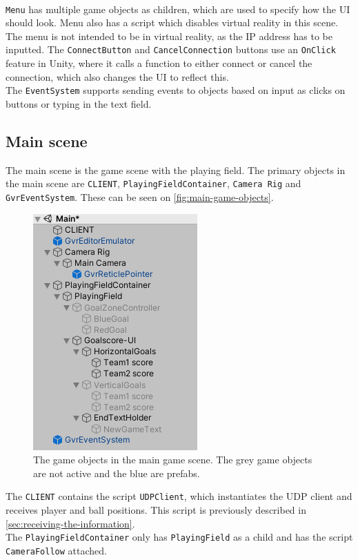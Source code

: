 \\
\texttt{Menu} has multiple game objects as children, which are used to specify how the UI should look.
Menu also has a script which disables virtual reality in this scene.
The menu is not intended to be in virtual reality, as the IP address has to be inputted.
The \texttt{ConnectButton} and \texttt{CancelConnection} buttons use an \texttt{OnClick} feature in Unity, where it calls a function to either connect or cancel the connection, which also changes the UI to reflect this.
\\
The \texttt{EventSystem} supports sending events to objects based on input as clicks on buttons or typing in the text field.

\subsection{Main scene}
The main scene is the game scene with the playing field.
The primary objects in the main scene are \texttt{CLIENT}, \texttt{PlayingFieldContainer}, \texttt{Camera Rig} and \texttt{GvrEventSystem}.
These can be seen on \autoref{fig:main-game-objects}.\begin{figure}[H]
    \centering
    \includegraphics[width=0.4\linewidth]{figures/unity-main-gameobjects.PNG}
    \caption{The game objects in the main game scene. The grey game objects are not active and the blue are prefabs.}
    \label{fig:main-game-objects}
\end{figure}
\noindent
The \texttt{CLIENT} contains the script \texttt{UDPClient}, which instantiates the UDP client and receives player and ball positions.
This script is previously described in \autoref{sec:receiving-the-information}.
\\
The \texttt{PlayingFieldContainer} only has \texttt{PlayingField} as a child and has the script \texttt{CameraFollow} attached.
